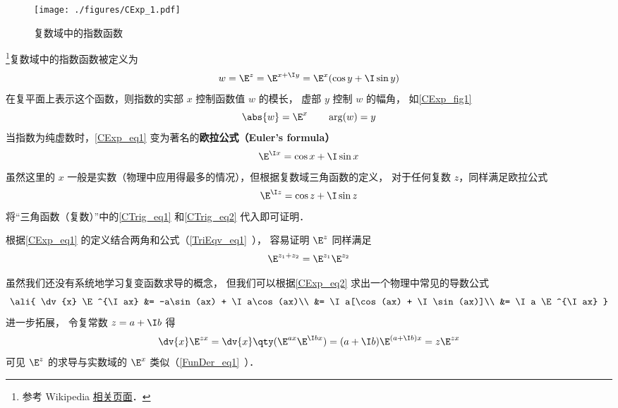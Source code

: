 


\begin{figure}[ht]
\centering
\texttt{[image: ./figures/CExp\_1.pdf]}
\caption{复数域中的指数函数} \label{CExp_fig1}
\end{figure}

\footnote{参考 Wikipedia \href{https://en.wikipedia.org/wiki/Euler's_formula}{相关页面}．}复数域中的指数函数被定义为
 \begin{equation}\label{CExp_eq1}
w = \E^z = \E^{x + \I y} = \E^x(\cos y + \I\sin y)
\end{equation}
在复平面上表示这个函数，则指数的实部 $x$ 控制函数值 $w$ 的模长， 虚部 $y$ 控制 $w$ 的幅角， 如\autoref{CExp_fig1}
 \begin{equation}
\abs{w} = \E^x \qquad \arg(w) = y
\end{equation}
当指数为纯虚数时，\autoref{CExp_eq1} 变为著名的\textbf{欧拉公式（Euler's formula）}
\begin{equation}\label{CExp_eq2}
\E^{\I x} = \cos x + \I\sin x
\end{equation}
虽然这里的 $x$ 一般是实数（物理中应用得最多的情况），但根据复数域三角函数的定义， 对于任何复数 $z$，同样满足欧拉公式
\begin{equation}
\E^{\I z} = \cos z + \I\sin z
\end{equation}
将“三角函数（复数）”中的\autoref{CTrig_eq1} 和\autoref{CTrig_eq2} 代入即可证明．

根据\autoref{CExp_eq1} 的定义结合两角和公式（\autoref{TriEqv_eq1}~）， 容易证明 $\E^z$ 同样满足
\begin{equation}
\E^{z_1 + z_2} = \E^{z_1}\E^{z_2}
\end{equation}

虽然我们还没有系统地学习复变函数求导的概念， 但我们可以根据\autoref{CExp_eq2} 求出一个物理中常见的导数公式
\begin{equation}\ali{
\dv{x} \E^{\I ax} &= -a\sin(ax) + \I a\cos(ax)\\
&= \I a[\cos(ax) + \I \sin(ax)]\\
&= \I a \E^{\I ax}
}\end{equation}
进一步拓展， 令复常数 $z = a + \I b$ 得
\begin{equation}
\dv{x}\E^{z x} = \dv{x} \qty(\E^{ax}\E^{\I bx}) = (a + \I b)\E^{(a+\I b)x} = z\E^{zx}
\end{equation}
可见 $\E^z$ 的求导与实数域的 $\E^x$ 类似（\autoref{FunDer_eq1}~）．

